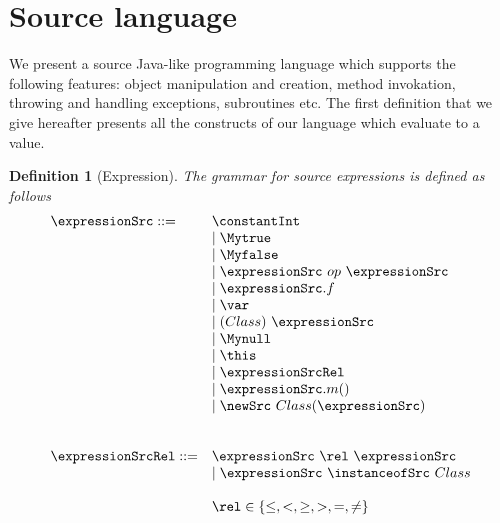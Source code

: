 
\newtheorem{Expression}{Definition}[section]
\newtheorem{ExpressionRel}[Expression]{Definition}
\newtheorem{Statement}[Expression]{Definition}

\section{Source language} \label{source}


We present a source Java-like programming language which supports the following features:
object manipulation and creation, method invokation, throwing and handling exceptions, subroutines etc.  
The first definition that we give hereafter presents all the constructs of our language which evaluate
to a value.

\begin{Expression}[Expression]\label{exprSrc}
    The grammar for source expressions  is defined as follows
    $$ \begin{array} {ll}    \expressionSrc ::=       
       		         	& \constantInt  \\
				& \mid \Mytrue \\ 
				& \mid \Myfalse \\
				& \mid \expressionSrc \ op \ \expressionSrc \\  
				& \mid \expressionSrc.f \\
				& \mid \var \\
  			        & \mid (Class) \ \expressionSrc \\
                                & \mid \Mynull  \\
				& \mid \this \\
              	        	& \mid \expressionSrcRel \\
				& \mid \expressionSrc.m( ) \\
				& \mid  \newSrc \ Class  ( \expressionSrc  ) \\ 
                                & \\
				& \\
        

     \expressionSrcRel ::=      & \expressionSrc \ \rel \ \expressionSrc \\
				& \mid \expressionSrc \ \instanceofSrc \ Class\\
				& \\   
				& \rel \in \{ \le, < ,  \ge, >, = , \neq \}                   
    \end{array} 
    $$
\end{Expression}


